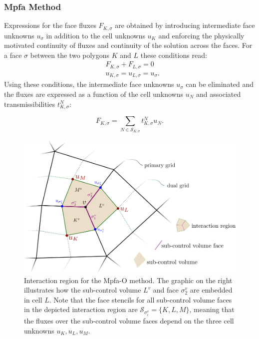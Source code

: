 \subsubsection{Mpfa Method}\label{cc_mpfa}
Expressions for the face fluxes $F_{K, \sigma}$ are obtained by introducing intermediate face unknowns $u_\sigma$ in addition to the cell unknowns $u_K$ and enforcing the physically motivated continuity of fluxes and continuity of the solution across the faces. For a face $\sigma$ between the two polygons $K$ and $L$ these conditions read:
\begin{equation}
    \begin{aligned}
        &F_{K, \sigma} + F_{L, \sigma} = 0 \\
        &{u}_{K,\sigma} = {u}_{L,\sigma} = {u}_{\sigma}.
        \label{eq:sigmaConditions}
    \end{aligned}
\end{equation}
Using these conditions, the intermediate face unknowns ${u}_\sigma$ can be eliminated and the fluxes are expressed as a function of the cell unknowns $u_N$ and associated transmissibilities $t^N_{K,\sigma}$:

\begin{equation}
    F_{K,\sigma} = \sum_{N \in \mathcal{S}_{K,\sigma}} t^N_{K,\sigma} u_{N}.
    \label{eq:FVFluxExpression}
\end{equation}

\begin{figure} [ht]
\centering
\includegraphics[width=0.8\linewidth,keepaspectratio]{png/mpfa_iv.png}
\caption{Interaction region for the Mpfa-O method. The graphic on the right illustrates how the sub-control volume $L^v$ and face $\sigma^v_2$ are embedded in cell $L$. Note that the face stencils for all sub-control volume faces in the depicted interaction region are $\mathcal{S}_{\sigma^v_i} = \{ K,L,M \}$, meaning that the fluxes over the sub-control volume faces depend on the three cell unknowns $u_K, u_L, u_M$.}
\label{pc:interactionRegion_mpfa}
\end{figure}

